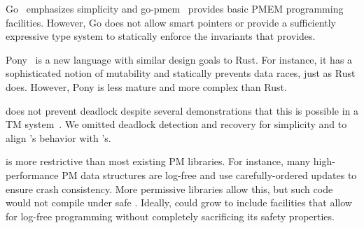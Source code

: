 Go~\cite{golang} emphasizes simplicity and go-pmem~\cite{gopmem} provides basic
PMEM programming facilities.  However, Go does not allow smart pointers or
provide a sufficiently expressive type system to statically enforce the
invariants that \this{} provides.

Pony~\cite{pony} is a new language with similar design goals to Rust.  For
instance, it has a sophisticated notion of mutability and statically prevents
data races, just as Rust does.  However, Pony is less mature and more complex
than Rust.



 \This{} does not prevent deadlock despite several
demonstrations that this is possible in a TM
system~\cite{convoider,grace,tm2c,stmlock}.  We omitted deadlock detection and
recovery for simplicity and to align 's behavior with 's.
  
 \This{} is more restrictive than most
existing PM libraries.  For instance, many high-performance PM data structures
are log-free and use carefully-ordered updates to ensure crash consistency.
More permissive libraries allow this, but such code would not compile under
safe \this{}.  Ideally, \this{} could grow to include
 facilities that allow for log-free programming without completely
sacrificing its safety properties.





  


